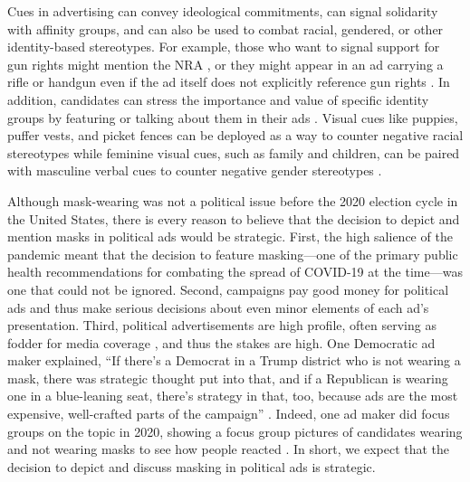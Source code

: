 Cues in advertising can convey ideological commitments, can signal solidarity with affinity groups, and can also be used to combat racial, gendered, or other identity-based stereotypes. For example, those who want to signal support for gun rights might mention the NRA \parencite{barry_guns_2020}, or they might appear in an ad carrying a rifle or handgun even if the ad itself does not explicitly reference gun rights \parencite{FFR_2021}. In addition, candidates can stress the importance and value of specific identity groups by featuring or talking about them in their ads \parencite{connaughton_invitations_2004}. Visual cues like puppies, puffer vests, and picket fences can be deployed as a way to counter negative racial stereotypes \parencite{tesler_raphael_2020,stephens-dougan_race_2020,gillespie_race_2018,hajnal_changing_2006} while feminine visual cues, such as family and children, can be paired with masculine verbal cues to counter negative gender stereotypes \parencite{carpinella2021visual}.

Although mask-wearing was not a political issue before the 2020 election cycle in the United States, there is every reason to believe that the decision to depict and mention masks in political ads would be strategic. First, the high salience of the pandemic meant that the decision to feature masking---one of the primary public health recommendations for combating the spread of COVID-19 at the time---was one that could not be ignored. Second, campaigns pay good money for political ads and thus make serious decisions about even minor elements of each ad's presentation. Third, political advertisements are high profile, often serving as fodder for media coverage \parencite{fowler_local_2009}, and thus the stakes are high. One Democratic ad maker explained, ``If there’s a Democrat in a Trump district who is not wearing a mask, there was strategic thought put into that, and if a Republican is wearing one in a blue-leaning seat, there’s strategy in that, too, because ads are the most expensive, well-crafted parts of the campaign'' \parencite{schneider_face_2020}.  Indeed, one ad maker did focus groups on the topic in 2020, showing a focus group pictures of candidates wearing and not wearing masks to see how people reacted \parencite{schneider_face_2020}.  In short, we expect that the decision to depict and discuss masking in political ads is strategic.

